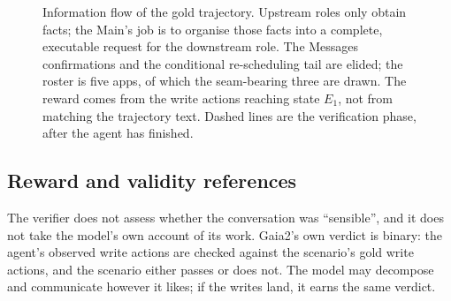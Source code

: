 \documentclass[11pt,a4paper]{article}
\begin{document}
\begin{figure}[H]
\caption{Information flow of the gold trajectory. Upstream roles only obtain facts; the Main's job is to organise those facts into a complete, executable request for the downstream role. The Messages confirmations and the conditional re-scheduling tail are elided; the roster is five apps, of which the seam-bearing three are drawn. The reward comes from the write actions reaching state $E_1$, not from matching the trajectory text. Dashed lines are the verification phase, after the agent has finished.}
\label{fig:trajectory}
\end{figure}

\subsection{Reward and validity references}

The verifier does not assess whether the conversation was ``sensible'', and it does not take the model's own account of its work. Gaia2's own verdict is binary: the agent's observed write actions are checked against the scenario's gold write actions, and the scenario either passes or does not. The model may decompose and communicate however it likes; if the writes land, it earns the same verdict.
\end{document}
